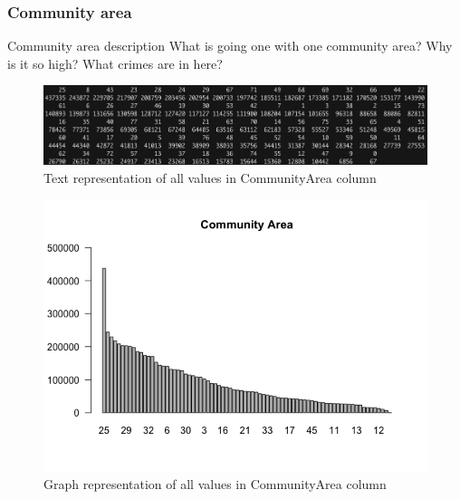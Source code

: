 \newpage
\subsubsection{Community area}
Community area description
What is going one with one community area? Why is it so high? What crimes are in here?
\begin{figure}[H]
\includegraphics[scale=0.4]{images/EDA/CommunityArea.jpg}
\centering
\caption{Text representation of all values in CommunityArea column}
\end{figure}
\begin{figure}[H]
\includegraphics[scale=0.7]{images/EDA/CommunityArea.png}
\centering
\caption{Graph representation of all values in CommunityArea column}
\end{figure}
